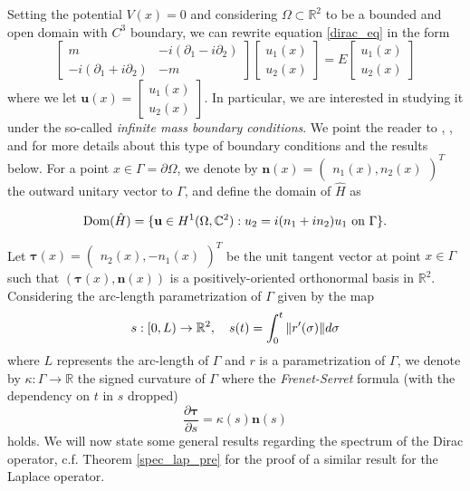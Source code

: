 Setting the potential \(V(x)=0\) and considering \(\Omega \subset \mathbb{R}^2\) to be a bounded and open domain with \(C^3\) boundary, we can rewrite equation \eqref{dirac_eq} in the form    
\begin{equation}\label{dirac}
    \begin{bmatrix}
        m & -i(\partial_1 - i \partial_2)\\
        -i(\partial_1 + i \partial_2) & -m
    \end{bmatrix}
    \begin{bmatrix}
        u_1(x)\\
        u_2(x)
    \end{bmatrix}
    =E
    \begin{bmatrix}
    u_1(x)\\
    u_2(x)
    \end{bmatrix}
\end{equation}
where we let \(\mathbf{u}(x)=\begin{bmatrix}
    u_1(x)\\
    u_2(x)
    \end{bmatrix}\).
In particular, we are interested in studying it under the so-called \textit{infinite mass boundary conditions}. We point the reader to \cite{lotoreichik2019sharp}, \cite{briet2022spectral}, and \cite{antunes2021variational} for more details about this type of boundary conditions and the results below. For a point \(x \in \Gamma = \partial \Omega\), we denote by \(\mathbf{n}(x) = \begin{pmatrix}
    n_1(x), n_2(x)
\end{pmatrix}^T\) the outward unitary vector to \(\Gamma\), and define the domain of \(\hat{H}\) as

\[
\operatorname{Dom}(\hat{H}) = \{\mathbf{u} \in H^1(\Omega, \mathbb{C}^2): u_2 = i(n_1+i n_2)u_1 \text{ on } \Gamma\}.
\]

Let \(\boldsymbol{\tau}(x) = \begin{pmatrix}
    n_2(x), -n_1(x)
\end{pmatrix}^T\) be the unit tangent vector at point \(x \in \Gamma\) such that \((\boldsymbol{\tau}(x), \mathbf{n}(x))\) is a positively-oriented orthonormal basis in \(\mathbb{R}^2\). Considering the arc-length parametrization of \(\Gamma\) given by the map
\[
s: [0, L) \rightarrow \mathbb{R}^2, \quad s(t) = \int_0^t \norm{r'(\sigma)} d\sigma
\]
where \(L\) represents the arc-length of \(\Gamma\) and \(r\) is a parametrization of \(\Gamma\), we denote by \(\kappa:\Gamma \rightarrow \mathbb{R}\) the signed curvature of \(\Gamma\) where the \textit{Frenet-Serret} formula (with the dependency on \(t\) in \(s\) dropped)
\begin{equation}\label{dirac_frenet_serret}
    \frac{\partial\boldsymbol{\tau}}{\partial s}=\kappa(s)\mathbf{n}(s)
\end{equation}
holds. We will now state some general results regarding the spectrum of the Dirac operator, c.f. Theorem \ref{spec_lap_pre} for the proof of a similar result for the Laplace operator.

